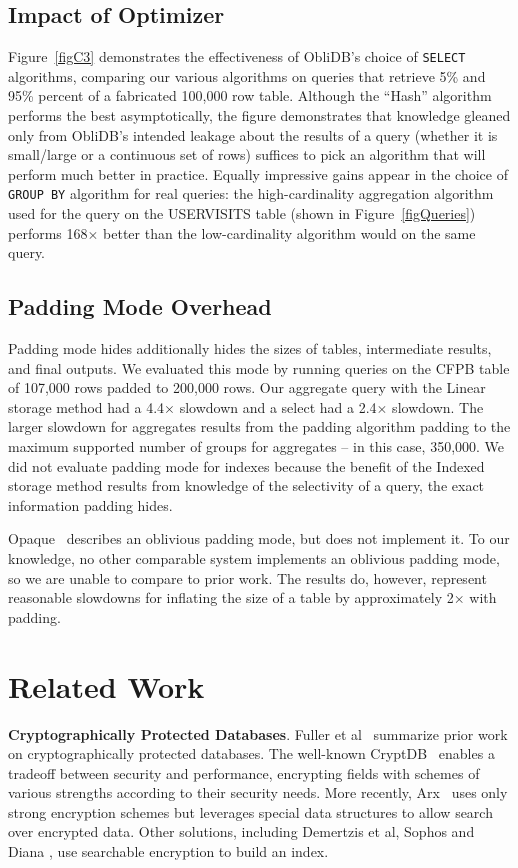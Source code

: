 \documentclass[letterpaper,twocolumn,10pt]{article}
\def\name/{ObliDB}
\begin{document}
\subsection{Impact of Optimizer}
Figure~\ref{figC3} demonstrates the effectiveness of \name/'s choice of \texttt{SELECT} algorithms, comparing our various algorithms on queries that retrieve 5\% and 95\% percent of a fabricated 100,000 row table. Although the ``Hash'' algorithm performs the best asymptotically, the figure demonstrates that knowledge gleaned only from \name/'s intended leakage about the results of a query (whether it is small/large or a continuous set of rows) suffices to pick an algorithm that will perform much better in practice. Equally impressive gains appear in the choice of \texttt{GROUP BY} algorithm for real queries: the high-cardinality aggregation algorithm used for the query on the USERVISITS table (shown in Figure~\ref{figQueries}) performs 168$\times$ better than the low-cardinality algorithm would on the same query.

\subsection{Padding Mode Overhead}
Padding mode hides additionally hides the sizes of tables, intermediate results, and final outputs. We evaluated this mode by running queries on the CFPB table of 107,000 rows padded to 200,000 rows. Our aggregate query with the Linear storage method had a 4.4$\times$ slowdown and a select had a 2.4$\times$ slowdown. The larger slowdown for aggregates results from the padding algorithm padding to the maximum supported number of groups for aggregates -- in this case, 350,000. We did not evaluate padding mode for indexes because the benefit of the Indexed storage method results from knowledge of the selectivity of a query, the exact information padding hides.

Opaque~\cite{ZDB+17} describes an oblivious padding mode, but does not implement it. To our knowledge, no other comparable system implements an oblivious padding mode, so we are unable to compare to prior work. The results do, however, represent reasonable slowdowns for inflating the size of a table by approximately 2$\times$ with padding.

\section{Related Work}\label{related}

  \noindent \textbf{Cryptographically Protected Databases}.
Fuller et al~\cite{FVY+17} summarize prior work on cryptographically protected databases. The well-known CryptDB~\cite{PRZB12} enables a tradeoff between security and performance, encrypting fields with schemes of various strengths according to their security needs. More recently, Arx~\cite{PBP16} uses only strong encryption schemes but leverages special data structures to allow search over encrypted data. Other solutions, including Demertzis et al, Sophos and Diana \cite{DPP+16, Bost16, BMO17}, use searchable encryption to build an index.
\end{document}
